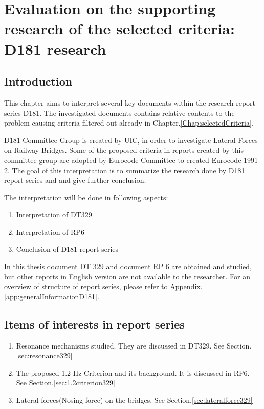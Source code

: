 \chapter{Evaluation on the supporting research of the selected criteria: D181 research}\label{sec:D181reportseries}


\section{Introduction}

This chapter aims to interpret several key documents within the research report series D181. The investigated documents contains relative contents to the problem-causing criteria filtered out already in Chapter.\ref{Chap:selectedCriteria}.

D181 Committee Group is created by UIC, in order to investigate Lateral Forces on Railway Bridges. Some of the proposed criteria in reports created by this committee group are adopted by Eurocode Committee to created Eurocode 1991-2. The goal of this interpretation is to summarize the research done by D181 report series and and give further conclusion.

The interpretation will be done in following aspects:

\begin{enumerate}
    \item Interpretation of DT329
    \item Interpretation of RP6
    \item Conclusion of D181 report series
\end{enumerate}

In this thesis document DT 329 and document RP 6 are obtained and studied, but other reports in English version are not available to the researcher.
For an overview of structure of report series, please refer to Appendix.\ref{app:generalInformationD181}.

\section{Items of interests in report series}

\begin{enumerate}
    \item Resonance mechanisms studied. They are discussed in DT329. See Section.\ref{sec:resonance329}
    \item The proposed 1.2 Hz Criterion and its background. It is discussed in RP6. See Section.\ref{sec:1.2criterion329}
    \item  Lateral forces(Nosing force) on the bridges. See Section.\ref{sec:lateralforce329}
\end{enumerate}


